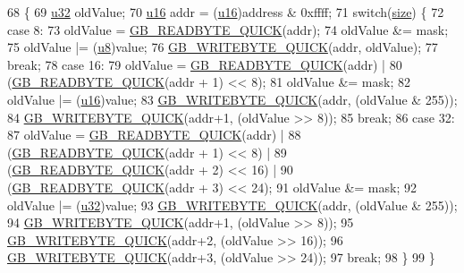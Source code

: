 \begin{DoxyCode}
68 \{
69   \mbox{\hyperlink{_system_8h_a10e94b422ef0c20dcdec20d31a1f5049}{u32}} oldValue;
70   \mbox{\hyperlink{_system_8h_a9e6c91d77e24643b888dbd1a1a590054}{u16}} addr = (\mbox{\hyperlink{_system_8h_a9e6c91d77e24643b888dbd1a1a590054}{u16}})address & 0xffff;
71   \textcolor{keywordflow}{switch}(\mbox{\hyperlink{expr-lex_8cpp_ab7d671599a7b25ca99a487fa341bc33a}{size}}) \{
72   \textcolor{keywordflow}{case} 8:
73     oldValue = \mbox{\hyperlink{_g_b_memory_viewer_dlg_8cpp_a74881b5ca2b8d5b69cca647c19c7674c}{GB\_READBYTE\_QUICK}}(addr);
74     oldValue &= mask;
75     oldValue |= (\mbox{\hyperlink{_system_8h_aed742c436da53c1080638ce6ef7d13de}{u8}})value;
76     \mbox{\hyperlink{_g_b_memory_viewer_dlg_8cpp_a8c737f227af92308de95d9486ee202c8}{GB\_WRITEBYTE\_QUICK}}(addr, oldValue);
77     \textcolor{keywordflow}{break};
78   \textcolor{keywordflow}{case} 16:
79     oldValue = \mbox{\hyperlink{_g_b_memory_viewer_dlg_8cpp_a74881b5ca2b8d5b69cca647c19c7674c}{GB\_READBYTE\_QUICK}}(addr) |
80       (\mbox{\hyperlink{_g_b_memory_viewer_dlg_8cpp_a74881b5ca2b8d5b69cca647c19c7674c}{GB\_READBYTE\_QUICK}}(addr + 1) << 8);
81     oldValue &= mask;
82     oldValue |= (\mbox{\hyperlink{_system_8h_a9e6c91d77e24643b888dbd1a1a590054}{u16}})value;
83     \mbox{\hyperlink{_g_b_memory_viewer_dlg_8cpp_a8c737f227af92308de95d9486ee202c8}{GB\_WRITEBYTE\_QUICK}}(addr, (oldValue & 255));
84     \mbox{\hyperlink{_g_b_memory_viewer_dlg_8cpp_a8c737f227af92308de95d9486ee202c8}{GB\_WRITEBYTE\_QUICK}}(addr+1, (oldValue >> 8));
85     \textcolor{keywordflow}{break};
86   \textcolor{keywordflow}{case} 32:
87     oldValue = \mbox{\hyperlink{_g_b_memory_viewer_dlg_8cpp_a74881b5ca2b8d5b69cca647c19c7674c}{GB\_READBYTE\_QUICK}}(addr) |
88       (\mbox{\hyperlink{_g_b_memory_viewer_dlg_8cpp_a74881b5ca2b8d5b69cca647c19c7674c}{GB\_READBYTE\_QUICK}}(addr + 1) << 8) |
89       (\mbox{\hyperlink{_g_b_memory_viewer_dlg_8cpp_a74881b5ca2b8d5b69cca647c19c7674c}{GB\_READBYTE\_QUICK}}(addr + 2) << 16) |
90       (\mbox{\hyperlink{_g_b_memory_viewer_dlg_8cpp_a74881b5ca2b8d5b69cca647c19c7674c}{GB\_READBYTE\_QUICK}}(addr + 3) << 24);
91     oldValue &= mask;
92     oldValue |= (\mbox{\hyperlink{_system_8h_a10e94b422ef0c20dcdec20d31a1f5049}{u32}})value;
93     \mbox{\hyperlink{_g_b_memory_viewer_dlg_8cpp_a8c737f227af92308de95d9486ee202c8}{GB\_WRITEBYTE\_QUICK}}(addr, (oldValue & 255));
94     \mbox{\hyperlink{_g_b_memory_viewer_dlg_8cpp_a8c737f227af92308de95d9486ee202c8}{GB\_WRITEBYTE\_QUICK}}(addr+1, (oldValue >> 8));
95     \mbox{\hyperlink{_g_b_memory_viewer_dlg_8cpp_a8c737f227af92308de95d9486ee202c8}{GB\_WRITEBYTE\_QUICK}}(addr+2, (oldValue >> 16));
96     \mbox{\hyperlink{_g_b_memory_viewer_dlg_8cpp_a8c737f227af92308de95d9486ee202c8}{GB\_WRITEBYTE\_QUICK}}(addr+3, (oldValue >> 24));
97     \textcolor{keywordflow}{break};
98   \}    
99 \}
\end{DoxyCode}
\mbox{\label{class_g_b_memory_viewer_a9feb85c84ffef853cad4139ea8c3c567}} 
